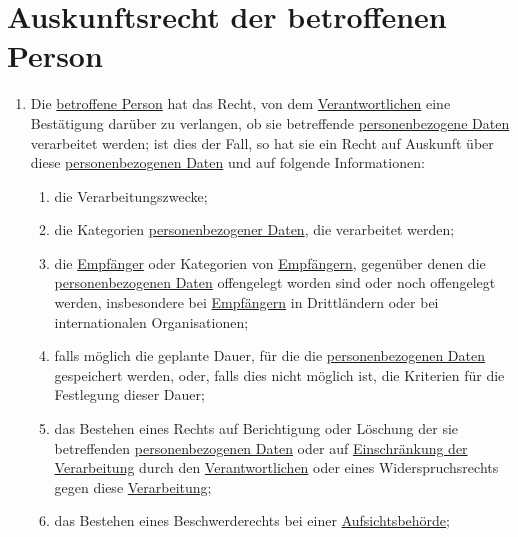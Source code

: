\chapter{Auskunftsrecht der betroffenen Person}
\label{ch:15}


\begin{enumerate}

  \item Die \hyperref[itm:04-1]{betroffene Person} hat das Recht, von dem \hyperref[itm:04-7]{Verantwortlichen} eine
   Bestätigung darüber zu verlangen, ob sie betreffende \hyperref[itm:04-1]{personenbezogene Daten} verarbeitet werden;
   ist dies der Fall, so hat sie ein Recht auf Auskunft über diese \hyperref[itm:04-1]{personenbezogenen Daten} und auf
   folgende Informationen:%
  \label{itm:15-1}

  \begin{enumerate}
  
    \item die Verarbeitungszwecke;%
    \label{itm:15-1a}

    \item die Kategorien \hyperref[itm:04-1]{personenbezogener Daten}, die verarbeitet werden;%
    \label{itm:15-1b}

    \item die \hyperref[itm:04-9]{Empfänger} oder Kategorien von \hyperref[itm:04-9]{Empfängern}, gegenüber denen
     die \hyperref[itm:04-1]{personenbezogenen Daten} offengelegt worden sind oder noch offengelegt werden,
     insbesondere bei \hyperref[itm:04-9]{Empfängern} in Drittländern oder bei internationalen Organisationen;%
    \label{itm:15-1c}

    \item falls möglich die geplante Dauer, für die die \hyperref[itm:04-1]{personenbezogenen Daten} gespeichert werden,
     oder, falls dies nicht möglich ist, die Kriterien für die Festlegung dieser Dauer;%
    \label{itm:15-1d}

    \item das Bestehen eines Rechts auf Berichtigung oder Löschung der sie betreffenden \hyperref[itm:04-1]
     {personenbezogenen Daten} oder auf
     \hyperref[itm:04-3]{Einschränkung der Verarbeitung} durch den \hyperref[itm:04-7]{Verantwortlichen} oder eines
      Widerspruchsrechts gegen diese \hyperref[itm:04-2]{Verarbeitung};%
    \label{itm:15-1e}

    \item das Bestehen eines Beschwerderechts bei einer \hyperref[itm:04-21]{Aufsichtsbehörde};%
    \label{itm:15-1f}


\end{enumerate}
\end{enumerate}
